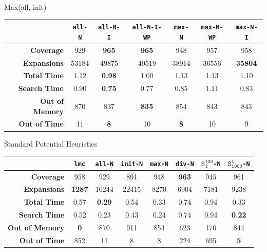 \documentclass[aspectratio=169, xcolor=dvipsnames]{beamer}
\begin{document}
    \begin{frame}[c]{Max(all, init)}
        \begin{table}[h!]
            \center
            \begin{tabular}{|r|c|c|c|c|c|c|}
                \hline
                & \textbf{\texttt{all-N}} & \textbf{\texttt{all-N-I}} & \textbf{\texttt{all-N-I-WP}} & \textbf{\texttt{max-N}} & \textbf{\texttt{max-N-WP}} & \textbf{\texttt{max-N-I}} \\
                \hline \hline
                \textbf{Coverage}       & 929 & \textbf{965} & \textbf{965} & 948 & 957 & 958 \\ \hline
                \textbf{Expansions}     & 53184 & 49875 & 40519 & 38914 & 36556 & \textbf{35804} \\ \hline
                \textbf{Total Time}     & 1.12 & \textbf{0.98} & 1.00 & 1.13 & 1.13 & 1.10 \\ \hline
                \textbf{Search Time}    & 0.90 & \textbf{0.75} & 0.77 & 0.85 & 1.11 & 0.83 \\ \hline
                \textbf{Out of Memory}  & 870 & 837 & \textbf{835} & 854 & 843 & 843 \\ \hline
                \textbf{Out of Time}    & 11 & \textbf{8} & 10 & \textbf{8} & 10 & 9 \\ \hline
            \end{tabular}
        \end{table}
    \end{frame}

    \begin{frame}[c]{Standard Potential Heuristics}
        \begin{table}[h!]
            \center
            \begin{tabular}{|r|c|c|c|c|c|c|c|}
                \hline
                & \textbf{\texttt{lmc}} & \textbf{\texttt{all-N}} & \textbf{\texttt{init-N}} & \textbf{\texttt{max-N}} & \textbf{\texttt{div-N}} & \textbf{$\texttt{S}_{\texttt{1}}^{\texttt{100}}$\texttt{-N}} & \textbf{$\texttt{S}_{\texttt{1000}}^{\texttt{1}}$\texttt{-N}} \\
                \hline \hline
                \textbf{Coverage}       & 958 & 929 & 891 & 948 & \textbf{963}  & 945 & 961   \\ \hline
                \textbf{Expansions}     & \textbf{1287} & 10244 & 22415 & 8270 & 6904 & 7181 & 9238  \\ \hline
                \textbf{Total Time}     & 0.57 & \textbf{0.29} & 0.54 & 0.33 & 0.74 & 0.94 & 0.33  \\ \hline
                \textbf{Search Time}    & 0.52 & 0.23 & 0.43 & 0.24 & 0.74 & 0.94 & \textbf{0.22}  \\ \hline
                \textbf{Out of Memory}  & \textbf{0}    & 870 & 911 & 854 & 623 & 170 & 844   \\ \hline
                \textbf{Out of Time}    & 852 & 11 & 8 & 8 & 224 & 695 & \textbf{5}     \\ \hline
            \end{tabular}
        \end{table}
    \end{frame}
\end{document}
